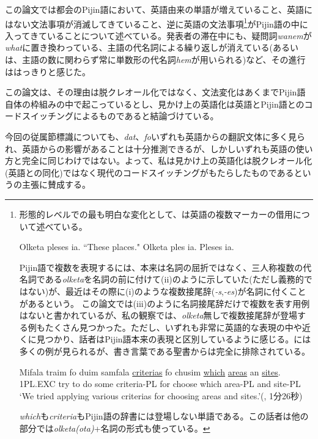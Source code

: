 \documentclass[11pt,a4paper]{jsarticle}
\begin{document}
この論文では都会のPijin語において、英語由来の単語が増えていること、英語にはない文法事項が消滅してきていること、逆に英語の文法事項\footnote{形態的レベルでの最も明白な変化として、\cite{nativization}は英語の複数マーカーの借用について述べている。
\begin{exe}
   Olketa pleses ia. \hspace{0.6in}``These places."
   Olketa ples ia.
   Pleses ia.
\end{exe}
Pijin語で複数を表現するには、本来は名詞の屈折ではなく、三人称複数の代名詞である\textit{olketa}を名詞の前に付けて(ii)のように示していた(ただし義務的ではない)が、最近はその際に(i)のような複数接尾辞(\textit{-s},\textit{-es})が名詞に付くことがあるという。
この論文では(iii)のように名詞接尾辞だけで複数を表す用例はないと書かれているが、私の観察では、\textit{olketa}無しで複数接尾辞が登場する例もたくさん見つかった。ただし、いずれも非常に英語的な表現の中や近くに見つかり、話者はPijin語本来の表現と区別しているように感じる。\cite{manguru}には多くの例が見られるが、書き言葉である聖書からは完全に排除されている。
\begin{exe}
  \gll Mifala traim fo duim samfala \underline{criterias} fo chusim \underline{which} \underline{areas} an \underline{sites}.\\
  1PL.EXC try to do some criteria-PL for choose which area-PL and site-PL\\
  \glt `We tried applying various criterias for choosing areas and sites.'(\cite{manguru}, 1分26秒)
\end{exe}
\textit{which}も\textit{criteria}もPijin語の辞書には登場しない単語である。この話者は他の部分では\textit{olketa(ota)}+名詞の形式も使っている。
}がPijin語の中に入ってきていることについて述べている。発表者の滞在中にも、疑問詞\textit{wanem}が\textit{what}に置き換わっている、主語の代名詞による繰り返しが消えている(あるいは、主語の数に関わらず常に単数形の代名詞\textit{hem}が用いられる)など、その進行ははっきりと感じた。

この論文は、その理由は脱クレオール化ではなく、文法変化はあくまでPijin語自体の枠組みの中で起こっているとし、見かけ上の英語化は英語とPijin語とのコードスイッチングによるものであると結論づけている。

今回の従属節標識についても、\textit{dat}、\textit{fo}いずれも英語からの翻訳文体に多く見られ、英語からの影響があることは十分推測できるが、しかしいずれも英語の使い方と完全に同じわけではない。よって、私は見かけ上の英語化は脱クレオール化(英語との同化)ではなく現代のコードスイッチングがもたらしたものであるという\cite{nativization}の主張に賛成する。
\end{document}
